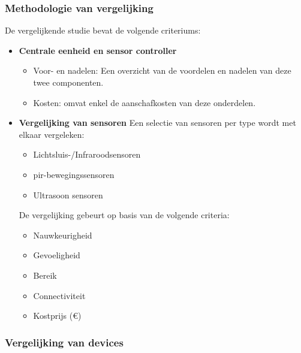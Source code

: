 \subsubsection{Methodologie van vergelijking}

De vergelijkende studie bevat de volgende criteriums:
\begin{itemize}
    \item \textbf{Centrale eenheid en sensor controller}
    \begin{itemize}
        \item Voor- en nadelen: Een overzicht van de voordelen en nadelen van deze twee componenten.
        \item Kosten: omvat enkel de aanschafkosten van deze onderdelen.  
    \end{itemize}
    
    \item \textbf{Vergelijking van sensoren}
    Een selectie van sensoren per type wordt met elkaar vergeleken:
    \begin{itemize}
        \item Lichtsluis-/Infraroodsensoren
        \item \gls{pir}-bewegingssensoren
        \item Ultrasoon sensoren
    \end{itemize}
    
    De vergelijking gebeurt op basis van de volgende criteria:
    \begin{itemize}
        \item Nauwkeurigheid
        \item Gevoeligheid
        \item Bereik
        \item Connectiviteit
        \item Kostprijs (€)
    \end{itemize}
\end{itemize}


\subsubsection{Vergelijking van devices}

